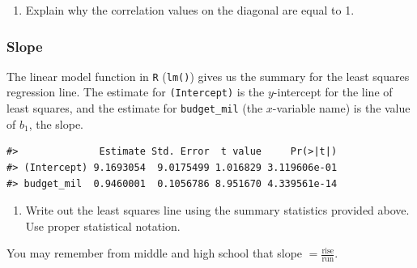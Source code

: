 \documentclass[
]{report}
\newenvironment{Shaded}{\begin{snugshade}}{\end{snugshade}}
\newcommand{\CommentTok}[1]{\textcolor[rgb]{0.56,0.35,0.01}{\textit{#1}}}
\newcommand{\DataTypeTok}[1]{\textcolor[rgb]{0.13,0.29,0.53}{#1}}
\newcommand{\KeywordTok}[1]{\textcolor[rgb]{0.13,0.29,0.53}{\textbf{#1}}}
\newcommand{\NormalTok}[1]{#1}
\newcommand{\OperatorTok}[1]{\textcolor[rgb]{0.81,0.36,0.00}{\textbf{#1}}}
\newcommand{\StringTok}[1]{\textcolor[rgb]{0.31,0.60,0.02}{#1}}
\providecommand{\tightlist}{%
  \setlength{\itemsep}{0pt}\setlength{\parskip}{0pt}}
\begin{document}
\begin{enumerate}
\def\labelenumi{\arabic{enumi}.}
\setcounter{enumi}{9}
\tightlist
\item
  Explain why the correlation values on the diagonal are equal to 1.
\end{enumerate}

\vspace{0.8in}

\newpage

\hypertarget{slope}{%
\subsubsection*{Slope}\label{slope}}

The linear model function in \texttt{R} (\texttt{lm()}) gives us the summary for the least squares regression line. The estimate for \texttt{(Intercept)} is the \(y\)-intercept for the line of least squares, and the estimate for \texttt{budget\_mil} (the \(x\)-variable name) is the value of \(b_1\), the slope.

\begin{Shaded}
\end{Shaded}

\begin{verbatim}
#>              Estimate Std. Error  t value     Pr(>|t|)
#> (Intercept) 9.1693054  9.0175499 1.016829 3.119606e-01
#> budget_mil  0.9460001  0.1056786 8.951670 4.339561e-14
\end{verbatim}

\begin{enumerate}
\def\labelenumi{\arabic{enumi}.}
\setcounter{enumi}{10}
\tightlist
\item
  Write out the least squares line using the summary statistics provided above. Use proper statistical notation.
\end{enumerate}

\vspace{.5in}

You may remember from middle and high school that slope \(=\frac{\mbox{rise}}{\mbox{run}}\).
\end{document}
